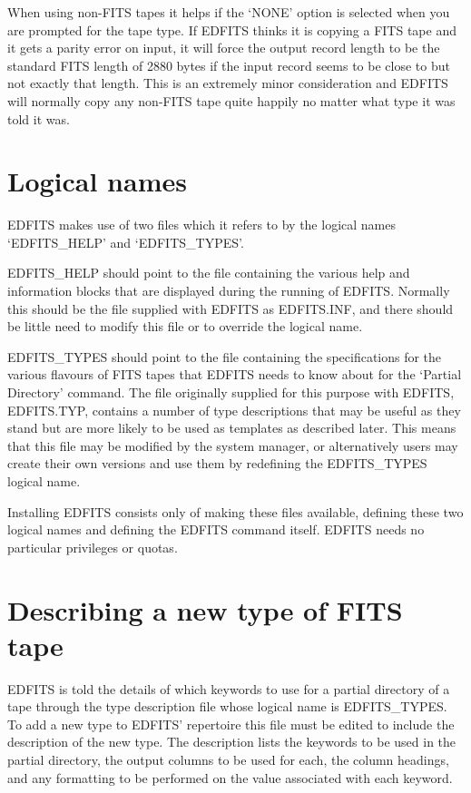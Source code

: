 When using non-FITS tapes it helps if the `NONE' option is selected when
you are prompted for the tape type.  If EDFITS thinks it is copying a FITS
tape and it gets a parity error on input, it will force the output record
length to be the standard FITS length of 2880 bytes if the input record 
seems to be close to but not exactly that length.  This is an extremely
minor consideration and EDFITS will normally copy any non-FITS tape 
quite happily no matter what type it was told it was.

\section{Logical names}

EDFITS makes use of two files which it refers to by the logical names
`EDFITS\_HELP' and `EDFITS\_TYPES'.  

EDFITS\_HELP should point to the file containing the various help and
information blocks that are displayed during the running of EDFITS.  Normally
this should be the file supplied with EDFITS as EDFITS.INF, and there
should be little need to modify this file or to override the logical name.

EDFITS\_TYPES should point to the file containing the specifications for the
various flavours of FITS tapes that EDFITS needs to know about for the
`Partial Directory' command.  The file originally supplied for this
purpose with EDFITS, EDFITS.TYP, contains a number of type descriptions
that may be useful as they stand but are more likely to be used as
templates as described later.  This means that this file may be modified
by the system manager, or alternatively users may create their own versions
and use them by redefining the EDFITS\_TYPES logical name.

Installing EDFITS consists only of making these files available, defining these
two logical names and defining the EDFITS command itself.  EDFITS needs no
particular privileges or quotas.

\section{Describing a new type of FITS tape}

EDFITS is told the details of which keywords to use for a partial directory
of a tape through the type description file whose logical name is EDFITS\_TYPES.
To add a new type to EDFITS' repertoire this file must be edited to include
the description of the new type.  The description lists the keywords to be
used in the partial directory, the output columns to be used for each, the
column headings, and any formatting to be performed on the value associated
with each keyword.

